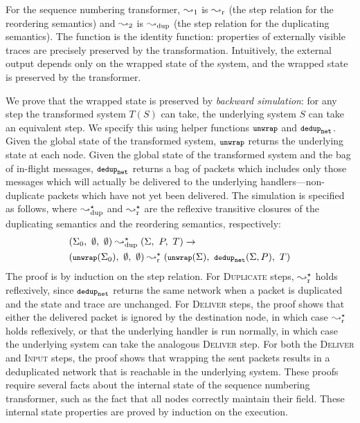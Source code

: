 For the sequence numbering transformer, $\leadsto_1$ is $\leadsto_{\mathrm{r}}$ (the
step relation for the reordering semantics) and $\leadsto_2$ is
$\leadsto_{\mathrm{dup}}$ (the step relation for the duplicating semantics). The
 function is the identity function: properties of
externally visible traces are precisely preserved by the
transformation. Intuitively, the external output
depends only on the wrapped state of the system, and the wrapped state
is preserved by the transformer.

We prove that the wrapped state is preserved by \emph{backward
simulation}: for any step the transformed system $T(S)$ can take, the
underlying system $S$ can take an equivalent step. We specify this using
helper functions $\unwrap$ and $\dedupnet$. Given the global state of
the transformed system, $\unwrap$ returns the underlying state at each
node.  Given the global state of the transformed system and the bag of
in-flight messages, $\dedupnet$ returns a bag of packets which
includes only those messages which will actually be delivered to the
underlying handlers---non-duplicate packets which have not yet been
delivered. The simulation is specified as follows, where
$\leadsto_{\mathrm{dup}}^\star$ and $\leadsto_{\mathrm{r}}^\star$ are the reflexive transitive
closures of the duplicating semantics and the reordering semantics, respectively:
\begin{align*}
  &(\Sigma_0,\ \emptyset,\ \emptyset) \fdupstepstar (\Sigma,\ P,\ T) \to \\
  &(\unwrap(\Sigma_0),\ \emptyset,\ \emptyset) \fastepstar (\unwrap(\Sigma),\ \dedupnet(\Sigma, P),\ T)
\end{align*}
The proof is by induction on the step relation. For
\textsc{Duplicate} steps, $\leadsto_{\mathrm{r}}^\star$ holds reflexively, since
$\dedupnet$ returns the same network when a packet is
duplicated and the state and trace are unchanged.
For \textsc{Deliver} steps, the proof shows that
either the delivered packet is ignored by the destination node, in
which case $\leadsto_{\mathrm{r}}^\star$ holds reflexively, or that the underlying
handler is run normally, in which case the underlying system can take
the analogous \textsc{Deliver} step. For both the \textsc{Deliver} and
\textsc{Input} steps, the proof shows that wrapping the sent packets
results in a deduplicated network that is reachable in the underlying
system. These proofs require several facts about the internal state of
the sequence numbering transformer, such as the fact that all nodes
correctly maintain their  field. These internal
state properties are proved by induction on the execution.

